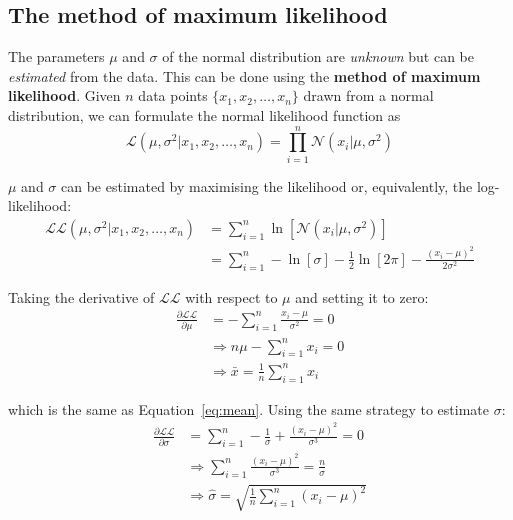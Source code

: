 \begin{refsection}
\section{The method of maximum likelihood}
\label{sec:maximum-likelihood}

The parameters $\mu$ and $\sigma$ of the normal distribution are
\emph{unknown} but can be \emph{estimated} from the data. This can be
done using the \textbf{method of maximum likelihood}.  Given $n$ data
points $\{x_1, x_2, \ldots, x_n\}$ drawn from a normal distribution,
we can formulate the normal likelihood function as
\begin{equation}
  \mathcal{L}(\mu,\sigma^2|x_1,x_2,\ldots,x_n) =
  \prod\limits_{i=1}^{n}\mathcal{N}(x_i|\mu,\sigma^2)
  \label{eq:Lnorm}
\end{equation}

$\mu$ and $\sigma$ can be estimated by maximising the likelihood or,
equivalently, the log-likelihood:
\begin{equation}
  \begin{split}
    \mathcal{LL}(\mu,\sigma^2|x_1,x_2,\ldots,x_n) & =
    \sum\limits_{i=1}^{n}\ln\left[\mathcal{N}(x_i|\mu,\sigma^2)\right] \\ & =
    \sum\limits_{i=1}^{n} -\ln[\sigma] - \frac{1}{2}\ln[2\pi] -
    \frac{(x_i-\mu)^2}{2\sigma^2}
  \end{split}
  \label{eq:LLnorm}
\end{equation}

Taking the derivative of $\mathcal{LL}$ with respect to $\mu$ and
setting it to zero:
\begin{equation}
  \begin{split}
    \frac{\partial{\mathcal{LL}}}{\partial{\mu}} & =
    - \sum\limits_{i=1}^{n} \frac{x_i-\mu}{\sigma^2} = 0 \\
    & \Rightarrow n\mu - \sum\limits_{i=1}^{n} x_i = 0 \\
    & \Rightarrow \bar{x} = \frac{1}{n}\sum\limits_{i=1}^{n}x_i
  \end{split}
  \label{eq:arithmeticmean}
\end{equation}

\noindent which is the same as Equation~\ref{eq:mean}. Using the same
strategy to estimate $\sigma$:
\begin{equation}
  \begin{split}
    \frac{\partial{\mathcal{LL}}}{\partial{\sigma}} & =
    \sum\limits_{i=1}^{n} - \frac{1}{\sigma} +  \frac{(x_i-\mu)^2}{\sigma^3} = 0\\
    & \Rightarrow  \sum\limits_{i=1}^{n} \frac{(x_i-\mu)^2}{\sigma^3} =
    \frac{n}{\sigma} \\
    & \Rightarrow \hat{\sigma} = \sqrt{\frac{1}{n}\sum\limits_{i=1}^{n}(x_i-\mu)^2}
  \end{split}
  \label{eq:stdevgivenmu}
\end{equation}


\end{refsection}
